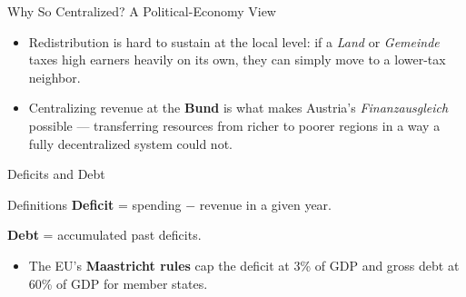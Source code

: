 \documentclass[11pt,aspectratio=169]{beamer}
\begin{document}
 

\begin{frame}{Why So Centralized? A Political-Economy View}
  \begin{itemize}
    \item Redistribution is hard to sustain at the local level: if a \emph{Land} or \emph{Gemeinde} taxes high earners heavily on its own, they can simply move to a lower-tax neighbor.
    \item Centralizing revenue at the \textbf{Bund} is what makes Austria's \emph{Finanzausgleich} possible --- transferring resources from richer to poorer regions in a way a fully decentralized system could not.

  \end{itemize}


\end{frame}

\begin{frame}{Deficits and Debt}
  \begin{block}{Definitions}
    \textbf{Deficit} = spending $-$ revenue in a given year.

       \textbf{Debt} = accumulated past deficits.
  \end{block}
  \begin{itemize}
    \item The EU's \textbf{Maastricht rules} cap the deficit at 3\% of GDP and gross debt at 60\% of GDP for member states.

  \end{itemize}

\end{frame}
\end{document}
